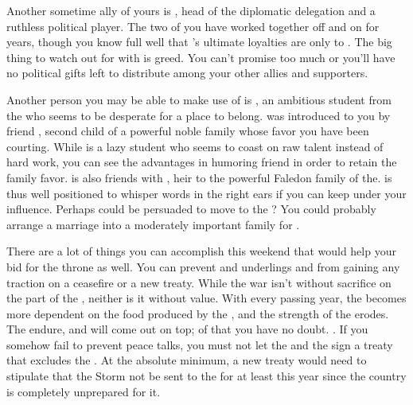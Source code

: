 \documentclass[char]{GL2020}
\begin{document}
Another sometime ally of yours is \cEvil{\intro}, head of the \pFarm{} diplomatic delegation and a ruthless political player. The two of you have worked together off and on for years, though you know full well that \cEvil{}'s ultimate loyalties are only to \cEvil{\themself}. The big thing to watch out for with \cEvil{} is \cEvil{\their} greed. You can’t promise \cEvil{\them} too much or you’ll have no political gifts left to distribute among your other allies and supporters.

Another person you may be able to make use of is \cAmbition{\intro}, an ambitious student from the \pTech{}who seems to be desperate for a place to belong. \cAmbition{} was introduced to you by \cAmbition{\their} friend \cChupStudent{\full}, second child of a powerful noble family whose favor you have been courting. While \cChupStudent{} is a lazy student who seems to coast on raw talent instead of hard work, you can see the advantages in humoring \cChupStudent{\their} friend in order to retain  the \cChupStudent{\formal} family favor. \cAmbition{} is also friends with \cHeir{\intro}, heir to the powerful Faledon family of the\pTech{}. \cAmbition{} is thus well positioned to whisper words in the right ears if you can keep \cAmbition{\them} under your influence. Perhaps \cAmbition{\they} could be persuaded to move to the \pFarm{}? You could probably arrange a marriage into a moderately important family for \cAmbition{\them}.

There are a lot of things you can accomplish this weekend that would help your bid for the throne as well. You can prevent \cHeadDiplomat{\intro} and \cHeadDiplomat{\their} underlings \cJuniorStatesman{\intro} and \cChupLeader{\intro} from gaining any traction on a ceasefire or a new treaty. While the war isn’t without sacrifice on the part of the \pFarm{}, neither is it without value. With every passing year, the \pTech{} becomes more dependent on the food produced by the \pFarm{}, and the strength of the \pShip{} erodes. The \pFarm{} endure, and will come out on top; of that you have no doubt. . If you somehow fail to prevent peace talks, you must not let the \pTech{} and the \pShip{} sign a treaty that excludes the \pFarm{}. At the absolute minimum, a new treaty would need to stipulate that the Storm not be sent to the \pFarm{} for at least this year since the country is completely unprepared for it. 
\end{document}
